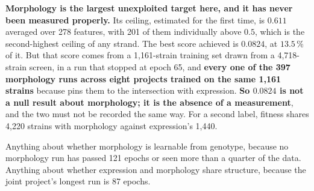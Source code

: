 \begin{keybox}
\textbf{Morphology is the largest unexploited target here, and it has never been measured
properly.} Its ceiling, estimated for the first time, is $0.611$ averaged over 278 features,
with 201 of them individually above $0.5$, which is the second-highest ceiling of any strand.
The best score achieved is $0.0824$, at $13.5\,\%$ of it. But that score comes from a
1,161-strain training set drawn from a 4,718-strain screen, in a run that stopped at epoch
65, and \textbf{every one of the 397 morphology runs across eight projects trained on the
same 1,161 strains} because  pins them to the intersection with
expression. \textbf{So $0.0824$ is not a null result about morphology; it is the absence of a
measurement}, and the two must not be recorded the same way. For a second label, fitness
shares 4,220 strains with morphology against expression's 1,440.
\end{keybox}

 Anything about whether morphology is learnable from genotype, because
no morphology run has passed 121 epochs or seen more than a quarter of the data. Anything
about whether expression and morphology share structure, because the joint project's
longest run is 87 epochs.
